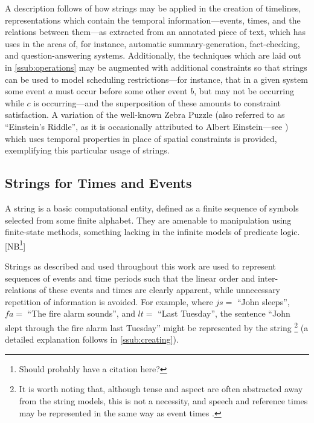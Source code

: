 \documentclass[a4paper,12pt,leqno]{article}
\newcommand{\vph}[1]{\vphantom{#1}}
\newcommand{\ebox}[1]{\fbox{$\vph{'(),}#1$}}
\newcommand{\EventString}[1]{%
	\renewcommand*{\do}[1]{\ebox{##1}}%
	\PipeParser{#1}%
}
\newcommand{\selfnote}[1]{{\color{red}[NB\footnote{{\color{red}#1}}]}}
\newcommand{\nb}{\selfnote}
\begin{document}
A description follows of how strings may be applied in the creation of timelines, representations which contain the temporal information---events, times, and the relations between them---as extracted from an annotated piece of text, which has uses in the areas of, for instance, automatic summary-generation, fact-checking, and question-answering systems. Additionally, the techniques which are laid out in \cref{ssub:operations} may be augmented with additional constraints so that strings can be used to model scheduling restrictions---for instance, that in a given system some event $a$ must occur before some other event $b$, but may not be occurring while $c$ is occurring---and the superposition of these amounts to constraint satisfaction. A variation of the well-known Zebra Puzzle (also referred to as ``Einstein's Riddle'', as it is occasionally attributed to Albert Einstein---see \citet[p. 10]{stangroom2009einstein}) which uses temporal properties in place of spatial constraints is provided, exemplifying this particular usage of strings.

\subsection{Strings for Times and Events}\label{sub:strings}
A string is a basic computational entity, defined as a finite sequence of symbols selected from some finite alphabet. They are amenable to manipulation using finite-state methods, something lacking in the infinite models of predicate logic. \nb{Should probably have a citation here?}

Strings as described and used throughout this work are used to represent sequences of events and time periods such that the linear order and inter-relations of these events and times are clearly apparent, while unnecessary repetition of information is avoided. For example, where $js =$ ``John sleeps'', $fa =$ ``The fire alarm sounds'', and $lt =$ ``Last Tuesday'', the sentence ``John slept through the fire alarm last Tuesday'' might be represented by the string \EventString{{}|lt|js,lt|fa,js,lt|js,lt|lt|{}}\footnote{It is worth noting that, although tense and aspect are often abstracted away from the string models, this is not a necessity, and speech and reference times may be represented in the same way as event times \citep{fernando2016regular,Derczynski2013,reichenbach1947elements}.} (a detailed explanation follows in \cref{ssub:creating}).
\end{document}
